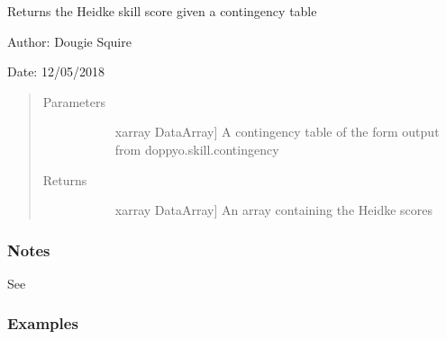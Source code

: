 \documentclass[letterpaper,10pt,english]{sphinxmanual}
\begin{document}

\begin{fulllineitems}
\label{\detokenize{skill_doc:skill.Heidke_score}}
Returns the Heidke skill score given a contingency table

\begin{DUlineblock}{0em}
\item[] Author: Dougie Squire
\item[] Date: 12/05/2018
\end{DUlineblock}
\begin{quote}\begin{description}
\item[{Parameters}] \leavevmode\begin{description}
\item[{}] \leavevmode{[}xarray DataArray{]}
A contingency table of the form output from doppyo.skill.contingency

\end{description}

\item[{Returns}] \leavevmode\begin{description}
\item[{}] \leavevmode{[}xarray DataArray{]}
An array containing the Heidke scores

\end{description}

\end{description}\end{quote}
\subsubsection*{Notes}

See 
\subsubsection*{Examples}


\end{fulllineitems}
\end{document}
